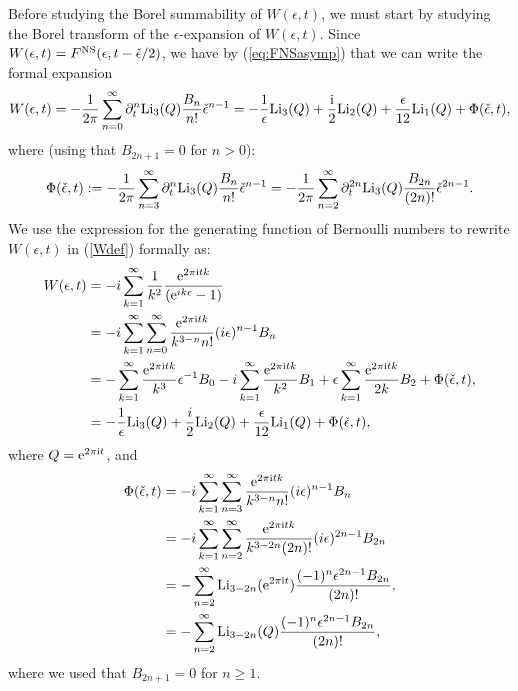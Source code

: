 \documentclass[pdftex]{sigma}
\numberwithin{equation}{section}
\begin{document}
Before studying the Borel summability of $W(\epsilon,t)$, we must start by studying the Borel transform of the $\epsilon$-expansion of $W(\epsilon,t)$. Since $W(\epsilon,t)=F^{\rm NS}(\epsilon,t-\check\epsilon/2)$, we have by (\ref{eq:FNSasymp}) that we can write the formal expansion
\begin{equation*}
 W(\epsilon,t)= -\frac{1}{2\pi} \sum_{n=0}^{\infty} \partial_t^n {\rm Li}_{3}(Q) \frac{B_n}{n!} \check{\epsilon}^{n-1}
=-\frac{1}{\epsilon} {\rm Li}_3(Q) + \frac{\mathrm{i}}{2} {\rm Li}_2(Q)+ \frac{\epsilon}{12} {\rm Li}_1(Q) +\Phi(\check{\epsilon},t),
\end{equation*}
where (using that $B_{2n+1}=0$ for $n>0$):
\begin{equation*}
 \Phi(\check{\epsilon},t):=-\frac{1}{2\pi} \sum_{n=3}^{\infty} \partial_t^n {\rm Li}_{3}(Q) \frac{B_n}{n!} \check{\epsilon}^{n-1}=-\frac{1}{2\pi} \sum_{n=2}^{\infty} \partial_t^{2n} {\rm Li}_{3}(Q) \frac{B_{2n}}{(2n)!} \check{\epsilon}^{2n-1}.
\end{equation*}
\iffalse
We use the expression for the generating function of Bernoulli numbers to rewrite $W(\epsilon,t)$ in (\ref{Wdef}) formally as:
\begin{align}
 W(\epsilon,t)&=-i \sum_{k=1}^{\infty} \frac{1}{k^2} \frac{{\rm e}^{2\pi {\rm i} t k}}{({\rm e}^{ik \epsilon}-1)}\\
 &=-i \sum_{k=1}^{\infty} \sum_{n=0}^{\infty} \frac{{\rm e}^{2\pi {\rm i} t k }}{k^{3-n} n!} (i\epsilon)^{n-1} B_n \\
 &= -\sum_{k=1}^{\infty} \frac{{\rm e}^{2\pi {\rm i} t k }}{k^{3} } \epsilon^{-1} B_0 - i \sum_{k=1}^{\infty} \frac{{\rm e}^{2\pi {\rm i} t k }}{k^{2} } B_1 + \epsilon \sum_{k=1}^{\infty} \frac{{\rm e}^{2\pi {\rm i} t k }}{2k} B_2 + \Phi(\check{\epsilon},t), \\
 &=-\frac{1}{\epsilon} {\rm Li}_3(Q) + \frac{i}{2} {\rm Li}_2(Q)+ \frac{\epsilon}{12} {\rm Li}_1(Q) +\Phi(\check{\epsilon},t),
\end{align}
where $Q={\rm e}^{2\pi {\rm i} t}$, and
\begin{align}
 \Phi(\check{\epsilon},t)&= -i \sum_{k=1}^{\infty} \sum_{n=3}^{\infty} \frac{{\rm e}^{2\pi {\rm i} t k }}{k^{3-n} n!} (i\epsilon)^{n-1} B_n\\
 &=-i\sum_{k=1}^{\infty} \sum_{n=2}^{\infty} \frac{{\rm e}^{2\pi {\rm i} t k }}{k^{3-2n} (2n)!} (i\epsilon)^{2n-1} B_{2n} \\
 &= -\sum_{n=2}^{\infty} {\rm Li}_{3-2n}({\rm e}^{2\pi {\rm i} t}) \frac{(-1)^{n} \epsilon^{2n-1} B_{2n}}{(2n)!},\\
 &= -\sum_{n=2}^{\infty} {\rm Li}_{3-2n}(Q) \frac{(-1)^{n} \epsilon^{2n-1} B_{2n}}{(2n)!},
\end{align}
where we used that $B_{2n+1}=0$ for $n\geq 1$.
\end{document}
